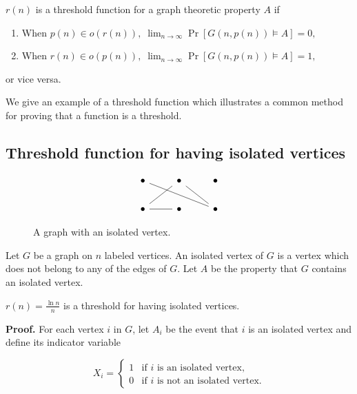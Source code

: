 \begin{definition}\label{def:probmet:threshold}
    $r(n)$ is a threshold function for a graph theoretic property $A$ if 
    \begin{enumerate}
        \item When \(p(n) \in o(r(n)), \; \lim_{n \to \infty} \Pr[G(n, p(n)) \vDash A] = 0,\)
        \item When \(r(n) \in o(p(n)), \;  \lim_{n \to \infty} \Pr[G(n, p(n)) \vDash A] = 1,\) 
    \end{enumerate}
    or vice versa.
\end{definition}

We give an example of a threshold function which illustrates a common method for proving that a function is a threshold. \par

\subsection{Threshold function for having isolated vertices}

\begin{figure}[h]
    \[\begin{tikzcd}
        \bullet & \bullet & \bullet \\
        \bullet & \bullet & \bullet
        \arrow[no head, from=2-1, to=1-2]
        \arrow[no head, from=2-1, to=2-2]
        \arrow[no head, from=1-2, to=2-3]
        \arrow[no head, from=2-3, to=1-1]
    \end{tikzcd}\]
    \caption{A graph with an isolated vertex.}
    \label{fig:isolatedvertex}
\end{figure}

Let $G$ be a graph on $n$ labeled vertices. An isolated vertex of $G$ is a vertex which does not belong to any of the edges of $G$. Let $A$ be the property that $G$ contains an isolated vertex.

\begin{theorem}\label{thm:probmet:isolatedverticesthreshold}
    $\displaystyle{r(n) = \frac{\ln n}{n}}$ is a threshold for having isolated vertices. 
\end{theorem}

\textbf{Proof. } For each vertex $i$ in $G$, let $A_i$ be the event that $i$ is an isolated vertex and define its indicator variable 

\[X_i = 
\left\{
	\begin{array}{ll}
		1  & \mbox{if } i \text{ is an isolated vertex,} \\
		0 & \mbox{if } i \text{ is not an isolated vertex.}
	\end{array}
\right.
\]

